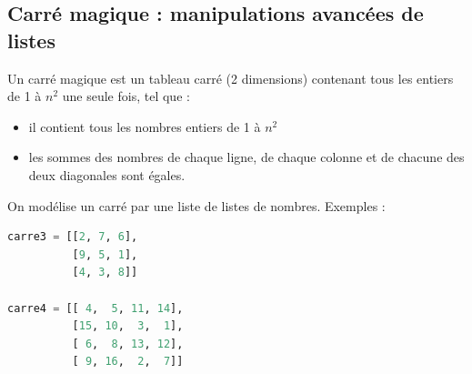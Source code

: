 \documentclass[a4paper, noanswers, addpoints, 12pt]{exam}
\begin{document}
\begin{questions}

\section{Carré magique : manipulations avancées de listes}
Un carré magique est un tableau carré (2 dimensions) contenant tous les entiers de 1 à $n^2$ une seule fois, tel que :
\begin{itemize}
    \item il contient tous les nombres entiers de 1 à $n^2$
    \item les sommes des nombres de chaque ligne, de chaque colonne et de chacune des deux diagonales sont égales.
\end{itemize}
On modélise un carré par une liste de listes de nombres. Exemples :
    \begin{lstlisting}[language=Python]
carre3 = [[2, 7, 6],
          [9, 5, 1],
          [4, 3, 8]]

carre4 = [[ 4,  5, 11, 14],
          [15, 10,  3,  1],
          [ 6,  8, 13, 12],
          [ 9, 16,  2,  7]]\end{lstlisting}
          

\end{questions}
\end{document}
